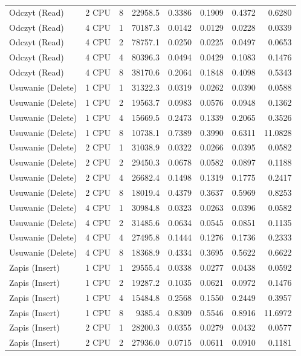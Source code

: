 \begin{table}[ht]
{\begin{tabular}{llcrrrrr}
Odczyt (Read) & 2 CPU & 8 & 22958.5 & 0.3386 & 0.1909 & 0.4372 & 0.6280 \\
Odczyt (Read) & 4 CPU & 1 & 70187.3 & 0.0142 & 0.0129 & 0.0228 & 0.0339 \\
Odczyt (Read) & 4 CPU & 2 & 78757.1 & 0.0250 & 0.0225 & 0.0497 & 0.0653 \\
Odczyt (Read) & 4 CPU & 4 & 80396.3 & 0.0494 & 0.0429 & 0.1083 & 0.1476 \\
Odczyt (Read) & 4 CPU & 8 & 38170.6 & 0.2064 & 0.1848 & 0.4098 & 0.5343 \\
Usuwanie (Delete) & 1 CPU & 1 & 31322.3 & 0.0319 & 0.0262 & 0.0390 & 0.0588 \\
Usuwanie (Delete) & 1 CPU & 2 & 19563.7 & 0.0983 & 0.0576 & 0.0948 & 0.1362 \\
Usuwanie (Delete) & 1 CPU & 4 & 15669.5 & 0.2473 & 0.1339 & 0.2065 & 0.3526 \\
Usuwanie (Delete) & 1 CPU & 8 & 10738.1 & 0.7389 & 0.3990 & 0.6311 & 11.0828 \\
Usuwanie (Delete) & 2 CPU & 1 & 31038.9 & 0.0322 & 0.0266 & 0.0395 & 0.0582 \\
Usuwanie (Delete) & 2 CPU & 2 & 29450.3 & 0.0678 & 0.0582 & 0.0897 & 0.1188 \\
Usuwanie (Delete) & 2 CPU & 4 & 26682.4 & 0.1498 & 0.1319 & 0.1775 & 0.2417 \\
Usuwanie (Delete) & 2 CPU & 8 & 18019.4 & 0.4379 & 0.3637 & 0.5969 & 0.8253 \\
Usuwanie (Delete) & 4 CPU & 1 & 30984.8 & 0.0323 & 0.0263 & 0.0396 & 0.0582 \\
Usuwanie (Delete) & 4 CPU & 2 & 31485.6 & 0.0634 & 0.0545 & 0.0851 & 0.1135 \\
Usuwanie (Delete) & 4 CPU & 4 & 27495.8 & 0.1444 & 0.1276 & 0.1736 & 0.2333 \\
Usuwanie (Delete) & 4 CPU & 8 & 18368.9 & 0.4334 & 0.3695 & 0.5622 & 0.6622 \\
Zapis (Insert) & 1 CPU & 1 & 29555.4 & 0.0338 & 0.0277 & 0.0438 & 0.0592 \\
Zapis (Insert) & 1 CPU & 2 & 19287.2 & 0.1035 & 0.0621 & 0.0972 & 0.1476 \\
Zapis (Insert) & 1 CPU & 4 & 15484.8 & 0.2568 & 0.1550 & 0.2449 & 0.3957 \\
Zapis (Insert) & 1 CPU & 8 & 9385.4 & 0.8309 & 0.5546 & 0.8916 & 11.6972 \\
Zapis (Insert) & 2 CPU & 1 & 28200.3 & 0.0355 & 0.0279 & 0.0432 & 0.0577 \\
Zapis (Insert) & 2 CPU & 2 & 27936.0 & 0.0715 & 0.0611 & 0.0910 & 0.1181 \\

\end{tabular}}
\end{table}
